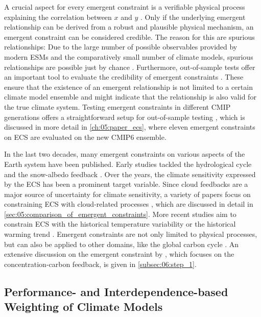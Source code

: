 A crucial aspect for every emergent constraint is a verifiable physical process
explaining the correlation between $x$ and $y$ \autocite{Hall2019}. Only if the
underlying emergent relationship can be derived from a robust and plausible
physical mechanism, an emergent constraint can be considered credible. The
reason for this are spurious relationships: Due to the large number of possible
observables provided by modern \acp{ESM} and the comparatively small number of
climate models, spurious relationships are possible just by chance
\autocite{Caldwell2014}. Furthermore, out-of-sample tests offer an important
tool to evaluate the credibility of emergent constraints \autocite{Hall2019}.
These ensure that the existence of an emergent relationship is not limited to a
certain climate model ensemble and might indicate that the relationship is also
valid for the true climate system. Testing emergent constraints in different
\ac{CMIP} generations offers a straightforward setup for out-of-sample testing
\autocite{Caldwell2018}, which is discussed in more detail in
\cref{ch:05:paper_ecs}, where eleven emergent constraints on \ac{ECS} are
evaluated on the new \acs{CMIP}6 ensemble.

In the last two decades, many emergent constraints on various aspects of the
Earth system have been published. Early studies tackled the hydrological cycle
\autocite{Allen2002} and the snow-albedo feedback \autocite{Hall2006}. Over the
years, the climate sensitivity expressed by the \ac{ECS} has been a prominent
target variable. Since cloud feedbacks are a major source of uncertainty for
climate sensitivity, a variety of papers focus on constraining \ac{ECS} with
cloud-related processes \autocite{Brient2015, Brient2016, Fasullo2012,
  Lipat2017, Sherwood2014, Su2014, Tian2015, Volodin2008, Qu2013, Zhai2015},
which are discussed in detail in
\cref{sec:05:comparison_of_emergent_constraints}. More recent studies aim to
constrain \ac{ECS} with the historical temperature variability
\autocite{Cox2018} or the historical warming trend
\autocite{JimenezdelaCuesta2019, Nijsse2020, Tokarska2020}. Emergent
constraints are not only limited to physical processes, but can also be applied
to other domains, like the global carbon cycle \autocite{Cox2013,
  Kwiatkowski2017, Wenzel2014, Wenzel2016, Winkler2019}. An extensive
discussion on the emergent constraint by \textcite{Wenzel2016}, which focuses
on the concentration-carbon feedback, is given in \cref{subsec:06:step_1}.


\subsection{Performance- and Interdependence-based Weighting of Climate Models}
\label{subsec:02:model_weighting}

